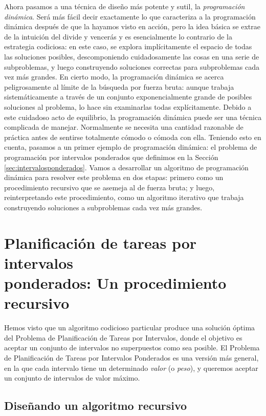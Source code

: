\documentclass[a4paper, 12pt]{book}
\theoremstyle{dotless}
\begin{document}
Ahora pasamos a una técnica de diseño más potente y sutil, la \textit{programación dinámica}.
Será más fácil decir exactamente lo que caracteriza a la programación dinámica después de que la hayamos visto en acción, pero la idea básica se extrae de la intuición del divide y vencerás y es esencialmente lo contrario de la estrategia codiciosa: en este caso, se explora implícitamente el espacio de todas las soluciones posibles, descomponiendo cuidadosamente las cosas en una serie de subproblemas, y luego construyendo soluciones correctas para subproblemas cada vez más grandes. 
En cierto modo, la programación dinámica se acerca peligrosamente al límite de la búsqueda por fuerza bruta: aunque trabaja sistemáticamente a través de un conjunto exponencialmente grande de posibles soluciones al problema, lo hace sin examinarlas todas explícitamente. 
Debido a este cuidadoso acto de equilibrio, la programación dinámica puede ser una técnica complicada de manejar.
Normalmente se necesita una cantidad razonable de práctica antes de sentirse totalmente cómodo o cómoda con ella.
Teniendo esto en cuenta, pasamos a un primer ejemplo de programación dinámica:
el problema de programación por intervalos ponderados que definimos en la
Sección \ref{sec:intervalosponderados}. 
Vamos a desarrollar un algoritmo de programación dinámica para resolver este problema en dos etapas: primero como un procedimiento recursivo que se asemeja al de fuerza bruta; y luego, reinterpretando este procedimiento, como un algoritmo iterativo que trabaja construyendo soluciones a subproblemas cada vez más grandes.

\section[Planificación de tareas por intervalos ponderados: Un procedimiento recursivo]{Planificación de tareas por intervalos\\ponderados: Un procedimiento recursivo}

Hemos visto que un algoritmo codicioso particular produce una solución óptima
del Problema de Planificación de Tareas por Intervalos, donde el objetivo es aceptar un conjunto de intervalos no superpuestos como sea posible. 
El Problema de Planificación de Tareas por Intervalos Ponderados es una versión más general, en la que cada intervalo tiene un determinado \textit{valor} (o \textit{peso}), y queremos aceptar un conjunto de intervalos de valor máximo.

\subsection{Diseñando un algoritmo recursivo}
\end{document}
